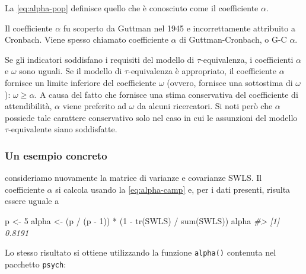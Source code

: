 \documentclass[
  11pt,
]{krantz}
\makeatletter
\newenvironment{Shaded}{\begin{snugshade}}{\end{snugshade}}
\newcommand{\CommentTok}[1]{\textcolor[rgb]{0.37,0.37,0.37}{\textit{#1}}}
\newcommand{\DecValTok}[1]{\textcolor[rgb]{0.06,0.06,0.06}{#1}}
\newcommand{\FunctionTok}[1]{\textcolor[rgb]{0,0,0}{#1}}
\newcommand{\NormalTok}[1]{#1}
\newcommand{\OtherTok}[1]{\textcolor[rgb]{0.37,0.37,0.37}{#1}}
\newcommand{\SpecialCharTok}[1]{\textcolor[rgb]{0,0,0}{#1}}
\newenvironment{kframe}{%
\medskip{}
\setlength{\fboxsep}{.8em}
 \def\at@end@of@kframe{}%
 \ifinner\ifhmode%
  \def\at@end@of@kframe{\end{minipage}}%
  \begin{minipage}{\columnwidth}%
 \fi\fi%
 \def\FrameCommand##1{\hskip\@totalleftmargin \hskip-\fboxsep
 \colorbox{shadecolor}{##1}\hskip-\fboxsep
     \hskip-\linewidth \hskip-\@totalleftmargin \hskip\columnwidth}%
 \MakeFramed {\advance\hsize-\width
   \@totalleftmargin\z@ \linewidth\hsize
   \@setminipage}}%
 {\par\unskip\endMakeFramed%
 \at@end@of@kframe}
\renewenvironment{Shaded}{\begin{kframe}}{\end{kframe}}
\theoremstyle{definition}
\theoremstyle{definition}
\theoremstyle{definition}
\theoremstyle{definition}
\theoremstyle{remark}
\makeatother
\begin{document}
La \eqref{eq:alpha-pop} definisce quello che è conosciuto come il coefficiente \(\alpha\).

Il coefficiente \(\alpha\) fu scoperto da Guttman nel 1945 e incorrettamente attribuito a Cronbach. Viene spesso chiamato coefficiente \(\alpha\) di Guttman-Cronbach, o G-C \(\alpha\).

Se gli indicatori soddisfano i requisiti del modello di \(\tau\)-equivalenza, i coefficienti \(\alpha\) e \(\omega\) sono uguali. Se il modello di \(\tau\)-equivalenza è appropriato, il coefficiente \(\alpha\) fornisce un limite inferiore del coefficiente \(\omega\) (ovvero, fornisce una sottostima di \(\omega\)): \(\omega \geq \alpha\). A causa del fatto che fornisce una stima conservativa del coefficiente di attendibilità, \(\alpha\) viene preferito ad \(\omega\) da alcuni ricercatori. Si noti però che \(\alpha\) possiede tale carattere conservativo solo nel caso in cui le assunzioni del modello \(\tau\)-equivalente siano soddisfatte.

\hypertarget{un-esempio-concreto-1}{%
\subsubsection{Un esempio concreto}\label{un-esempio-concreto-1}}

consideriamo nuovamente la matrice di varianze e covarianze SWLS. Il coefficiente \(\alpha\) si calcola usando la \eqref{eq:alpha-camp} e, per i dati presenti, risulta essere uguale a

\begin{Shaded}
\begin{Highlighting}[]
\NormalTok{p }\OtherTok{\textless{}{-}} \DecValTok{5}
\NormalTok{alpha }\OtherTok{\textless{}{-}}\NormalTok{ (p }\SpecialCharTok{/}\NormalTok{ (p }\SpecialCharTok{{-}} \DecValTok{1}\NormalTok{)) }\SpecialCharTok{*}\NormalTok{ (}\DecValTok{1} \SpecialCharTok{{-}} \FunctionTok{tr}\NormalTok{(SWLS) }\SpecialCharTok{/} \FunctionTok{sum}\NormalTok{(SWLS))}
\NormalTok{alpha}
\CommentTok{\#\textgreater{} [1] 0.8191}
\end{Highlighting}
\end{Shaded}

Lo stesso risultato si ottiene utilizzando la funzione \texttt{alpha()} contenuta nel pacchetto \texttt{psych}:
\end{document}
